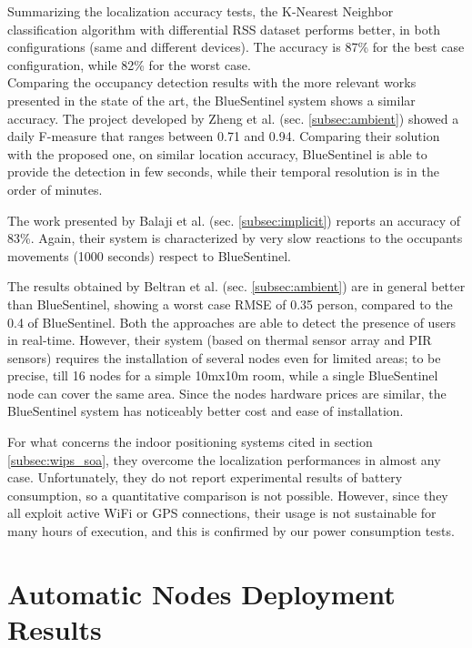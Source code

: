 Summarizing the localization accuracy tests, the K-Nearest Neighbor classification algorithm with differential RSS dataset performs better, in both configurations (same and different devices). The accuracy is 87\% for the best case configuration, while 82\% for the worst case.\\
Comparing the occupancy detection results with the more relevant works presented in the state of the art, the BlueSentinel system shows a similar accuracy.
The project developed by Zheng et al. \cite{Cossio2012} (sec. \ref{subsec:ambient}) showed a daily F-measure that ranges between 0.71 and 0.94. Comparing their solution with the proposed one, on similar location accuracy, BlueSentinel is able to provide the detection in few seconds, while their temporal resolution is in the order of minutes.

 The work presented by Balaji et al. \cite{Balaji2013} (sec. \ref{subsec:implicit}) reports an accuracy of 83\%. Again, their system is characterized by very slow reactions to the occupants movements (1000 seconds) respect to BlueSentinel.

The results obtained by Beltran et al. \cite{Beltran2013} (sec. \ref{subsec:ambient}) are in general better than BlueSentinel, showing a worst case RMSE of 0.35 person, compared to the 0.4 of BlueSentinel. Both the approaches are able to detect the presence of users in real-time. However, their system (based on thermal sensor array and PIR sensors) requires the installation of several nodes even for limited areas; to be precise, till 16 nodes for a simple 10mx10m room, while a single BlueSentinel node can cover the same area. Since the nodes hardware prices are similar, the BlueSentinel system has noticeably better cost and ease of installation.

For what concerns the indoor positioning systems cited in section \ref{subsec:wips_soa}, they overcome the localization performances in almost any case. Unfortunately, they do not report experimental results of battery consumption, so a quantitative comparison is not possible. However, since they all exploit active WiFi or GPS connections, their usage is not sustainable for many hours of execution, and this is confirmed by our power consumption tests.

\section{Automatic Nodes Deployment Results}
\label{sec:CAD-test}

